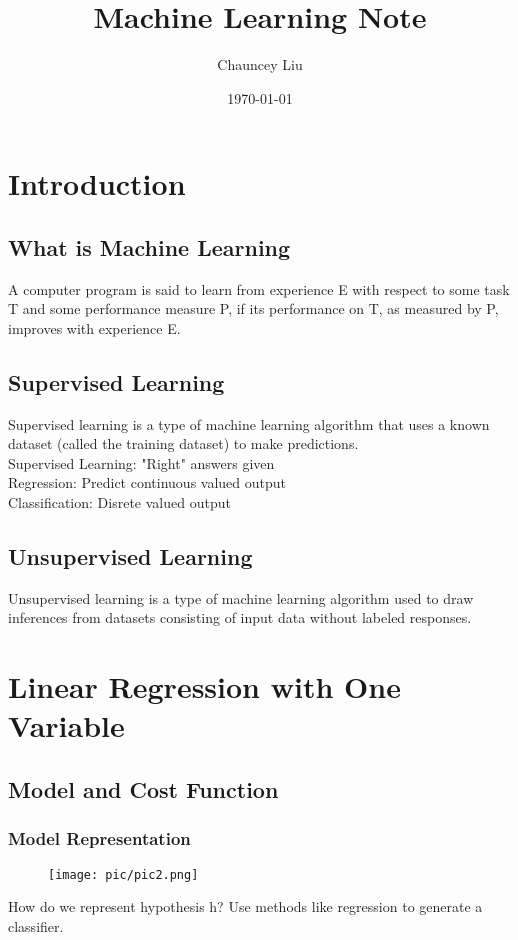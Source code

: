 \documentclass{article}
\title{\textbf{Machine Learning Note}}
\author{Chauncey Liu}
\date{\today}
\begin{document}
 
\maketitle
 
\tableofcontents

\newpage
 
\section{Introduction}
\subsection{What is Machine Learning}
A computer program is said to learn from experience E with respect to some task T and some performance measure P, if its performance on T, as measured by P, improves with experience E.

\subsection{Supervised Learning}
Supervised learning is a type of machine learning algorithm that uses a known dataset (called the training dataset) to make predictions.\\

Supervised Learning: "Right" answers given \\
Regression: Predict continuous valued output \\
Classification: Disrete valued output \\

\subsection{Unsupervised Learning}
Unsupervised learning is a type of machine learning algorithm used to draw inferences from datasets consisting of input data without labeled responses.\\

\section{Linear Regression with One Variable}
\subsection{Model and Cost Function}
\subsubsection{Model Representation}
\begin{figure}[h]
\centering
\texttt{[image: pic/pic2.png]}
\end{figure}
How do we represent hypothesis h? Use methods like regression to generate a classifier.
\end{document}
